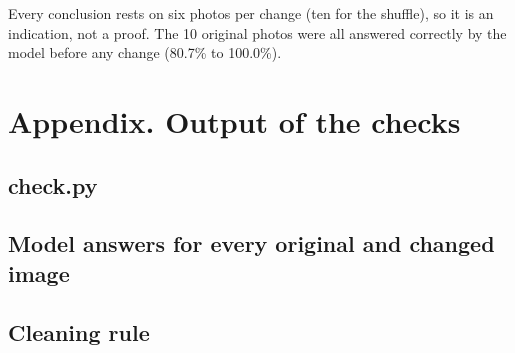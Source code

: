 \documentclass[11pt]{article}
\begin{document}
Every conclusion rests on six photos per change (ten for the shuffle), so it is an indication, not a proof. The 10 original photos were all answered correctly by the model before any change (80.7\% to 100.0\%).

\section*{Appendix. Output of the checks}
\subsection*{check.py}
\subsection*{Model answers for every original and changed image}
\subsection*{Cleaning rule}
\end{document}
